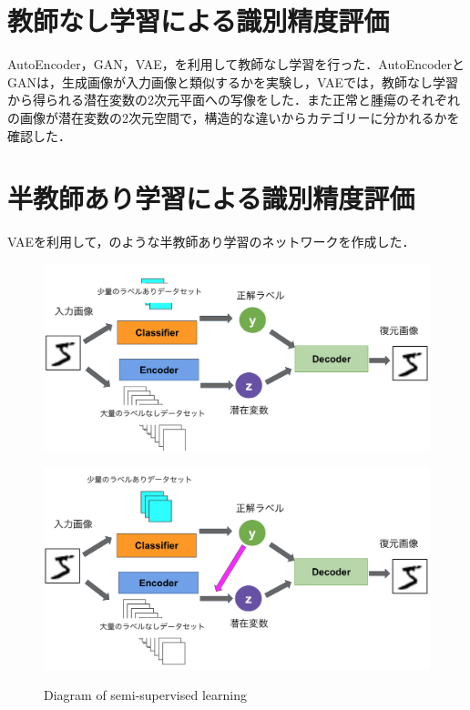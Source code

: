 \section{教師なし学習による識別精度評価}
AutoEncoder，GAN，VAE，を利用して教師なし学習を行った．AutoEncoderとGANは，生成画像が入力画像と類似するかを実験し，VAEでは，教師なし学習から得られる潜在変数の2次元平面への写像をした．また正常と腫瘍のそれぞれの画像が潜在変数の2次元空間で，構造的な違いからカテゴリーに分かれるかを確認した．


\section{半教師あり学習による識別精度評価}
VAEを利用して，のような半教師あり学習のネットワークを作成した．

\begin{figure}[H]
	\centering
	\begin{minipage}{\columnwidth}
		\centering
		\includegraphics[width=0.7\linewidth]{fig/chapter3/networks/patern_A}
		\label{fig:VAE-a}
	\end{minipage}
	
	\begin{minipage}{\columnwidth}
		\centering
		\includegraphics[width=0.7\linewidth]{fig/chapter3/networks/patern_B}
		\label{fig:VAE-b}
	\end{minipage}
	
	\caption{Diagram of semi-supervised learning}
	\label{fig:半教師}
	
\end{figure}



